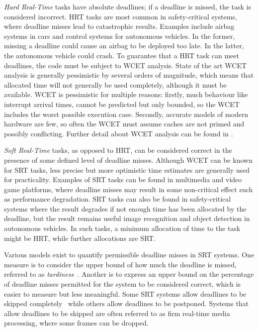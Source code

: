 \emph{Hard Real-Time} tasks have absolute deadlines; if a deadline is missed,
the task is considered incorrect. \gls{HRT} tasks are most common in safety-critical systems, where
deadline misses lead to catastrophic results.  Examples include airbag systems
in cars and control systems for autonomous vehicles.  In the former, missing a deadline could cause
an airbag to be deployed too late.  In the latter, the autonomous vehicle could crash.  To guarantee
that a \gls{HRT} task can meet deadlines, the code must be subject to {\gls{WCET}} analysis. State
of the art {\gls{WCET}} analysis is generally pessimistic by several orders of magnitude, which
means that allocated time will not generally be used completely, although it must be available.
WCET is pessimistic for multiple reasons: firstly, much behaviour like interrupt arrival times, 
cannot be predicted but only
bounded, so the WCET includes the worst possible execution case. Secondly, accurate models of modern
hardware are few, so often the WCET must assume caches are not primed and possibly conflicting. 
Further detail about {\gls{WCET}} analysis can be found in \citet{Lv_GZDYZ_09}.

\emph{Soft Real-Time} tasks, as opposed to \gls{HRT}, can be
considered correct in the presence of some defined level of deadline misses. Although {\gls{WCET}}
can be known for {\gls{SRT}} tasks, less precise but more optimistic time estimates are generally
used for practicality.  Examples of \gls{SRT} tasks can be found in multimedia and video game platforms,
where deadline misses may result in some non-critical effect such as performance degradation.
\gls{SRT} tasks can also be found in safety-critical systems where the result degrades if not enough
time has been
allocated by the deadline, but the result remains useful \eg image recognition and object detection
in autonomous vehicles. In such tasks, a minimum allocation of time to the task might be \gls{HRT},
while further allocations are \gls{SRT}.

Various models exist to quantify permissible deadline misses in \gls{SRT} systems.  One measure is
to consider the upper bound of how much the deadline is missed, referred to as
\emph{tardiness}~\citep{Devi:phd}.  Another is to express an upper bound on the percentage of
deadline misses permitted for the system to be considered correct, which is easier to measure but
less meaningful. Some \gls{SRT} systems allow deadlines to be skipped
completely~\citep{Koren_Shasha_95} while others allow deadlines to be postponed. Systems that allow
deadlines to be skipped are often referred to as firm real-time \eg media processing, where some
frames can be dropped. 

